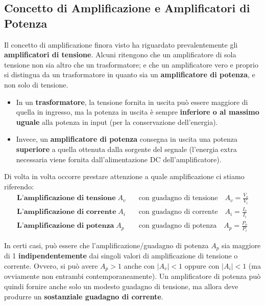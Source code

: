 \documentclass[openany,a4paper,12pt]{book}
\begin{document}
\subsection*{Concetto di Amplificazione e Amplificatori di Potenza}

Il concetto di amplificazione finora visto ha riguardato prevalentemente gli \textbf{amplificatori di tensione}. Alcuni ritengono che un amplificatore di sola tensione non sia altro che un trasformatore; e che un amplificatore vero e proprio si distingua da un trasformatore in quanto sia un \textbf{amplificatore di potenza}, e non solo di tensione.

\begin{itemize}[label=\textcolor{PoliBlue}{\textbullet}]
    \item In un \textbf{trasformatore}, la tensione fornita in uscita può essere maggiore di quella in ingresso, ma la potenza in uscita è sempre \textbf{inferiore o al massimo uguale} alla potenza in input (per la conservazione dell'energia).
    \item Invece, un \textbf{amplificatore di potenza} consegna in uscita una potenza \textbf{superiore} a quella ottenuta dalla sorgente del segnale (l'energia extra necessaria viene fornita dall'alimentazione DC dell'amplificatore).
\end{itemize}

Di volta in volta occorre prestare attenzione a quale amplificazione ci stiamo riferendo:
\begin{align}
    \textbf{L'amplificazione di tensione}\; A_v \quad &\text{con guadagno di tensione} \quad A_v = \frac{V_o}{V_i} \\[1ex]
    \textbf{L'amplificazione di corrente}\; A_i \quad &\text{con guadagno di corrente} \quad A_i = \frac{I_o}{I_i} \\[1ex]
    \textbf{L'amplificazione di potenza}\; A_p \quad &\text{con guadagno di potenza} \quad A_p = \frac{P_o}{P_i}
\end{align}

\begin{nota}
    In certi casi, può essere che l'amplificazione/guadagno di potenza $A_p$ sia maggiore di 1 \textbf{indipendentemente} dai singoli valori di amplificazione di tensione o corrente. Ovvero, si può avere $A_p > 1$ anche con $|A_v| < 1$ oppure con $|A_i| < 1$ (ma ovviamente non entrambi contemporaneamente). Un amplificatore di potenza può quindi fornire anche solo un modesto guadagno di tensione, ma allora deve produrre un \textbf{sostanziale guadagno di corrente}.
\end{nota}
\end{document}
